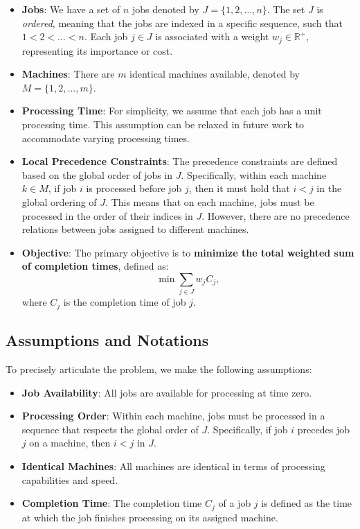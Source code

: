 \begin{itemize}
    \item \textbf{Jobs}: We have a set of $n$ jobs denoted by $J = \{1, 2, \dots, n\}$. The set $J$ is \emph{ordered}, meaning that the jobs are indexed in a specific sequence, such that $1 < 2 < \dots < n$. Each job $j \in J$ is associated with a weight $w_j \in \mathbb{R}^+$, representing its importance or cost.

    \item \textbf{Machines}: There are $m$ identical machines available, denoted by $M = \{1, 2, \dots, m\}$.

    \item \textbf{Processing Time}: For simplicity, we assume that each job has a unit processing time. This assumption can be relaxed in future work to accommodate varying processing times.

    \item \textbf{Local Precedence Constraints}: The precedence constraints are defined based on the global order of jobs in $J$. Specifically, within each machine $k \in M$, if job $i$ is processed before job $j$, then it must hold that $i < j$ in the global ordering of $J$. This means that on each machine, jobs must be processed in the order of their indices in $J$. However, there are no precedence relations between jobs assigned to different machines.

    \item \textbf{Objective}: The primary objective is to \textbf{minimize the total weighted sum of completion times}, defined as:
    \[
        \min \sum_{j \in J} w_j C_j,
    \]
    where $C_j$ is the completion time of job $j$.
\end{itemize}

\subsection{Assumptions and Notations}

To precisely articulate the problem, we make the following assumptions:

\begin{itemize}
    \item \textbf{Job Availability}: All jobs are available for processing at time zero.

    \item \textbf{Processing Order}: Within each machine, jobs must be processed in a sequence that respects the global order of $J$. Specifically, if job $i$ precedes job $j$ on a machine, then $i < j$ in $J$.

    \item \textbf{Identical Machines}: All machines are identical in terms of processing capabilities and speed.

    \item \textbf{Completion Time}: The completion time $C_j$ of a job $j$ is defined as the time at which the job finishes processing on its assigned machine.
\end{itemize}

